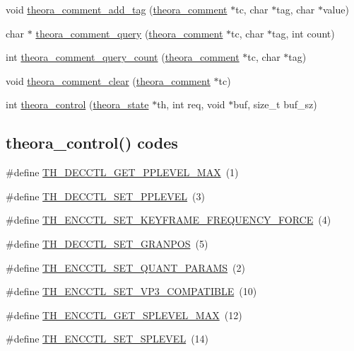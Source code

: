 \begin{DoxyCompactItemize}
\item 
void \hyperlink{group__oldfuncs_ga339bd80b5bf4bb168b7052d8ec0b5a92}{theora\+\_\+comment\+\_\+add\+\_\+tag} (\hyperlink{structtheora__comment}{theora\+\_\+comment} $\ast$tc, char $\ast$tag, char $\ast$value)
\item 
char $\ast$ \hyperlink{group__oldfuncs_ga4361f6001abb5c83c36a2ddfb648a8dc}{theora\+\_\+comment\+\_\+query} (\hyperlink{structtheora__comment}{theora\+\_\+comment} $\ast$tc, char $\ast$tag, int count)
\item 
int \hyperlink{group__oldfuncs_ga10f66a3c752442a3e0c0098e0f88df8b}{theora\+\_\+comment\+\_\+query\+\_\+count} (\hyperlink{structtheora__comment}{theora\+\_\+comment} $\ast$tc, char $\ast$tag)
\item 
void \hyperlink{group__oldfuncs_ga04c07c2eefba3a433e43f9fbde14719f}{theora\+\_\+comment\+\_\+clear} (\hyperlink{structtheora__comment}{theora\+\_\+comment} $\ast$tc)
\item 
int \hyperlink{group__oldfuncs_ga186773db3bc8cd550047e7df1b2ba2c9}{theora\+\_\+control} (\hyperlink{structtheora__state}{theora\+\_\+state} $\ast$th, int req, void $\ast$buf, size\+\_\+t buf\+\_\+sz)
\end{DoxyCompactItemize}
\subsection*{theora\+\_\+control() codes}
\begin{DoxyCompactItemize}
\item 
\#define \hyperlink{group__oldfuncs_gab31f251c9319f2140d247585d30b3d07}{T\+H\+\_\+\+D\+E\+C\+C\+T\+L\+\_\+\+G\+E\+T\+\_\+\+P\+P\+L\+E\+V\+E\+L\+\_\+\+M\+A\+X}~(1)
\item 
\#define \hyperlink{group__oldfuncs_ga87774c35e1a755a84e2d705b38ebef0d}{T\+H\+\_\+\+D\+E\+C\+C\+T\+L\+\_\+\+S\+E\+T\+\_\+\+P\+P\+L\+E\+V\+E\+L}~(3)
\item 
\#define \hyperlink{group__oldfuncs_ga27e755e15b4b5604c54974b304037a49}{T\+H\+\_\+\+E\+N\+C\+C\+T\+L\+\_\+\+S\+E\+T\+\_\+\+K\+E\+Y\+F\+R\+A\+M\+E\+\_\+\+F\+R\+E\+Q\+U\+E\+N\+C\+Y\+\_\+\+F\+O\+R\+C\+E}~(4)
\item 
\#define \hyperlink{group__oldfuncs_ga1e870c654d35394f0d490045df04e0f5}{T\+H\+\_\+\+D\+E\+C\+C\+T\+L\+\_\+\+S\+E\+T\+\_\+\+G\+R\+A\+N\+P\+O\+S}~(5)
\item 
\#define \hyperlink{group__oldfuncs_ga3befcdd66678f8d27034f9c4b16d1b9c}{T\+H\+\_\+\+E\+N\+C\+C\+T\+L\+\_\+\+S\+E\+T\+\_\+\+Q\+U\+A\+N\+T\+\_\+\+P\+A\+R\+A\+M\+S}~(2)
\item 
\#define \hyperlink{group__oldfuncs_ga382d685a39a34d8e6ba76b00d804efd8}{T\+H\+\_\+\+E\+N\+C\+C\+T\+L\+\_\+\+S\+E\+T\+\_\+\+V\+P3\+\_\+\+C\+O\+M\+P\+A\+T\+I\+B\+L\+E}~(10)
\item 
\#define \hyperlink{group__oldfuncs_ga9baf5bdd206e80c78a8fd44687e89783}{T\+H\+\_\+\+E\+N\+C\+C\+T\+L\+\_\+\+G\+E\+T\+\_\+\+S\+P\+L\+E\+V\+E\+L\+\_\+\+M\+A\+X}~(12)
\item 
\#define \hyperlink{group__oldfuncs_gabd9fbcb6a25a77d991d3620164fe59d6}{T\+H\+\_\+\+E\+N\+C\+C\+T\+L\+\_\+\+S\+E\+T\+\_\+\+S\+P\+L\+E\+V\+E\+L}~(14)
\end{DoxyCompactItemize}


